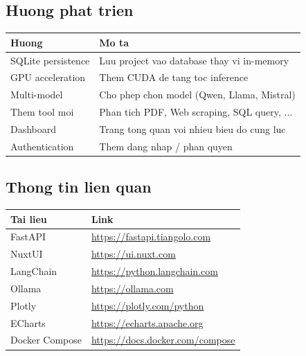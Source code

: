 \documentclass[12pt,a4paper]{article}
\begin{document}
\subsection{Huong phat trien}

\begin{tabularx}{\textwidth}{lX}
\toprule
\bfseries Huong & \bfseries Mo ta \\
\midrule
SQLite persistence
& Luu project vao database thay vi in-memory \\
GPU acceleration
& Them CUDA de tang toc inference \\
Multi-model
& Cho phep chon model (Qwen, Llama, Mistral) \\
Them tool moi
& Phan tich PDF, Web scraping, SQL query, ... \\
Dashboard
& Trang tong quan voi nhieu bieu do cung luc \\
Authentication
& Them dang nhap / phan quyen \\
\bottomrule
\end{tabularx}

\subsection{Thong tin lien quan}

\begin{tabularx}{\textwidth}{lX}
\toprule
\bfseries Tai lieu & \bfseries Link \\
\midrule
FastAPI & \url{https://fastapi.tiangolo.com} \\
NuxtUI & \url{https://ui.nuxt.com} \\
LangChain & \url{https://python.langchain.com} \\
Ollama & \url{https://ollama.com} \\
Plotly & \url{https://plotly.com/python} \\
ECharts & \url{https://echarts.apache.org} \\
Docker Compose & \url{https://docs.docker.com/compose} \\
\bottomrule
\end{tabularx}
\end{document}
